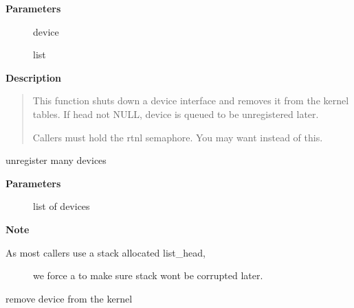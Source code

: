 \documentclass[a4paper,8pt,english]{sphinxmanual}
\begin{document}
\textbf{Parameters}
\begin{description}
\item[{}] \leavevmode
device

\item[{}] \leavevmode
list

\end{description}

\textbf{Description}
\begin{quote}

This function shuts down a device interface and removes it
from the kernel tables.
If head not NULL, device is queued to be unregistered later.

Callers must hold the rtnl semaphore.  You may want
{\hyperref[networking/kapi:c.unregister_netdev]{\emph{}}} instead of this.
\end{quote}

\begin{fulllineitems}
\label{networking/kapi:c.unregister_netdevice_many}
unregister many devices

\end{fulllineitems}


\textbf{Parameters}
\begin{description}
\item[{}] \leavevmode
list of devices

\end{description}

\textbf{Note}
\begin{description}
\item[{As most callers use a stack allocated list\_head,}] \leavevmode
we force a  to make sure stack wont be corrupted later.

\end{description}

\begin{fulllineitems}
\label{networking/kapi:c.unregister_netdev}
remove device from the kernel

\end{fulllineitems}
\end{document}
